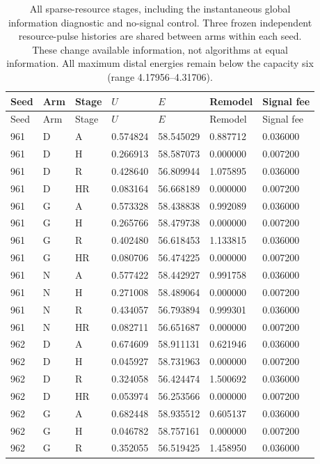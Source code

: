 \begingroup\scriptsize\setlength{\tabcolsep}{3pt}
\begin{longtable}{lllllll}
\caption{All sparse-resource stages, including the instantaneous global information diagnostic and no-signal control. Three frozen independent resource-pulse histories are shared between arms within each seed. These change available information, not algorithms at equal information. All maximum distal energies remain below the capacity six (range 4.17956--4.31706).}\label{tab:reach-sparse}\\
\toprule
Seed & Arm & Stage & $U$ & $E$ & Remodel & Signal fee\\
\midrule\endfirsthead
\toprule
Seed & Arm & Stage & $U$ & $E$ & Remodel & Signal fee\\
\midrule\endhead
961 & D & A & 0.574824 & 58.545029 & 0.887712 & 0.036000\\
961 & D & H & 0.266913 & 58.587073 & 0.000000 & 0.007200\\
961 & D & R & 0.428640 & 56.809944 & 1.075895 & 0.036000\\
961 & D & HR & 0.083164 & 56.668189 & 0.000000 & 0.007200\\
961 & G & A & 0.573328 & 58.438838 & 0.992089 & 0.036000\\
961 & G & H & 0.265766 & 58.479738 & 0.000000 & 0.007200\\
961 & G & R & 0.402480 & 56.618453 & 1.133815 & 0.036000\\
961 & G & HR & 0.080706 & 56.474225 & 0.000000 & 0.007200\\
961 & N & A & 0.577422 & 58.442927 & 0.991758 & 0.036000\\
961 & N & H & 0.271008 & 58.489064 & 0.000000 & 0.007200\\
961 & N & R & 0.434057 & 56.793894 & 0.999301 & 0.036000\\
961 & N & HR & 0.082711 & 56.651687 & 0.000000 & 0.007200\\
962 & D & A & 0.674609 & 58.911131 & 0.621946 & 0.036000\\
962 & D & H & 0.045927 & 58.731963 & 0.000000 & 0.007200\\
962 & D & R & 0.324058 & 56.424474 & 1.500692 & 0.036000\\
962 & D & HR & 0.053974 & 56.253566 & 0.000000 & 0.007200\\
962 & G & A & 0.682448 & 58.935512 & 0.605137 & 0.036000\\
962 & G & H & 0.046782 & 58.757161 & 0.000000 & 0.007200\\
962 & G & R & 0.352055 & 56.519425 & 1.458950 & 0.036000\\

\end{longtable}
